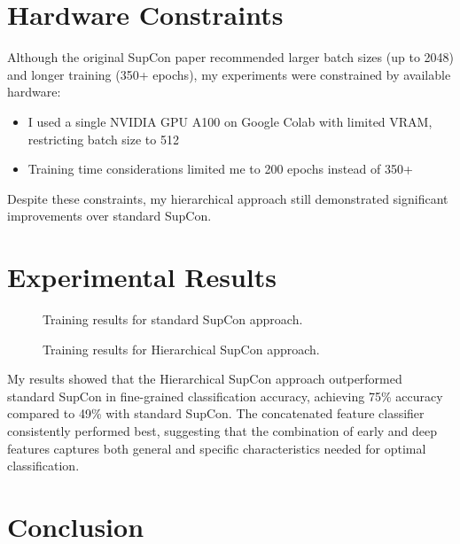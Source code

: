 \documentclass[10pt,a4paper]{article}
\begin{document}
\section{Hardware Constraints}

Although the original SupCon paper recommended larger batch sizes (up to 2048) and longer training (350+ epochs), my experiments were constrained by available hardware:

\begin{itemize}
    \item I used a single NVIDIA GPU A100 on Google Colab with limited VRAM, restricting batch size to 512
    \item Training time considerations limited me to 200 epochs instead of 350+
\end{itemize}

Despite these constraints, my hierarchical approach still demonstrated significant improvements over standard SupCon.

\section{Experimental Results}

\begin{figure}[h]
\centering
{}
\caption{Training results for standard SupCon approach.}
\label{fig:supcon_results}
\end{figure}

\begin{figure}[h]
\centering
{}
\caption{Training results for Hierarchical SupCon approach.}
\label{fig:hier_supcon_results}
\end{figure}

My results showed that the Hierarchical SupCon approach outperformed standard SupCon in fine-grained classification accuracy, achieving 75\% accuracy compared to 49\% with standard SupCon. The concatenated feature classifier consistently performed best, suggesting that the combination of early and deep features captures both general and specific characteristics needed for optimal classification.

\section{Conclusion}
\end{document}
